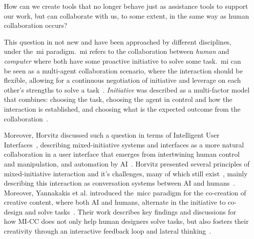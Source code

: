 
\begin{retQuestion}{}
    How can we create tools that no longer behave just as assistance tools to support our work, but can collaborate with us, to some extent, in the same way as human collaboration occurs? 
\end{retQuestion}




This question in not new and have been approached by different disciplines, under the~\acrfull{mi} paradigm.~\acrshort{mi} refers to the collaboration between \emph{human} and \emph{computer} where both have some proactive initiative to solve some task.~\acrshort{mi} can be seen as a multi-agent collaboration scenario, where the interaction should be flexible, allowing for a continuous negotiation of initiative and leverage on each other's strengths to solve a task~\cite{Allen99-MIinteraction}. \emph{Initiative} was described as a multi-factor model that combines: choosing the task, choosing the agent in control and how the interaction is established, and choosing what is the expected outcome from the collaboration~\cite{novick97-mixedInit}. 

Moreover, Horvitz discussed such a question in terms of Intelligent User Interfaces~\cite{Birnbaum97-IUI}, describing mixed-initiative systems and interfaces as a more natural collaboration in a user interface that emerges from intertwining human control and manipulation, and automation by AI~\cite{Horvitz99-uncertainty}. Horvitz presented several principles of mixed-initiative interaction and it's challenges, many of which still exist~\cite{Horvitz99-mixedInit}, mainly describing this interaction as conversation systems between AI and humans~\cite{horvitz1999-conversationModel}. Moreover, Yannakakis et al. introduced the~\acrfull{micc} paradigm for the co-creation of creative content, where both AI and humans, alternate in the initiative to co-design and solve tasks~\cite{yannakakis2014micc}. Their work describes key findings and discussions for how MI-CC does not only help human designers solve tasks, but also fosters their creativity through an interactive feedback loop and lateral thinking~\cite{Liapis2016-CanComputersFosterCreativity,Liapis2014-gameCreativity,Alvarez2018}. 

